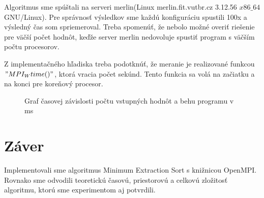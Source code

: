 \documentclass[11pt,a4paper,titlepage,final]{article}
\begin{document}
Algoritmus sme spúštali na serveri merlin(Linux merlin.fit.vutbr.cz 3.12.56 $x86\_64$ GNU/Linux). Pre správnosť výsledkov sme každú konfiguráciu spustili 100x a výsledný čas som spriemeroval. Treba spomenúť, že nebolo možné overiť riešenie pre väčší počet hodnôt, keďže server merlin nedovoluje spustiť program s väčším počtu procesorov.

Z implementačného hľadiska treba podotknúť, že meranie je realizované funkcou $"MPI_Wtime()"$, ktorá vracia počet sekúnd. Tento funkcia sa volá na začiatku a na konci pre koreňový procesor.
 \begin{figure}[h]

\begin{center}
\caption{Graf časovej závislosti počtu vstupných hodnôt a behu programu v ms}
\end{center}

\end{figure}

\section{Záver}
Implementovali sme algoritmus Minimum Extraction Sort s knižnicou OpenMPI. Rovnako sme odvodili teoretickú časovú, priestorovú a celkovú zložitosť algoritmu, ktorú sme experimentom aj potvrdili.
\end{document}
